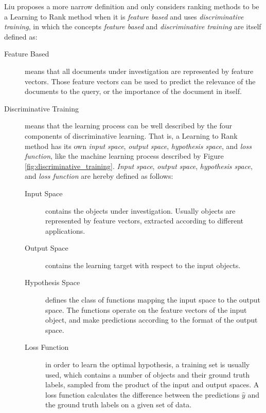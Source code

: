 Liu \cite{Liu2007} proposes a more narrow definition and only considers ranking methods to be a Learning to Rank method when it is \emph{feature based} and uses \emph{discriminative training}, in which the concepts \emph{feature based} and \emph{discriminative training} are itself defined as:
\begin{description}
\item[Feature Based]{means that all documents under investigation are represented by feature vectors. Those feature vectors can be used to predict the relevance of the documents to the query, or the importance of the document in itself.}
\item[Discriminative Training]{means that the learning process can be well described by the four components of discriminative learning. That is, a Learning to Rank method has its own \emph{input space}, \emph{output space}, \emph{hypothesis space}, and \emph{loss function}, like the machine learning process described by Figure \ref{fig:discriminative_training}. \emph{Input space}, \emph{output space}, \emph{hypothesis space}, and \emph{loss function} are hereby defined as follows:
	\begin{description}
	\item[Input Space]{contains the objects under investigation. Usually objects are represented by feature vectors, extracted according to different applications.}
	\item[Output Space]{contains the learning target with respect to the input objects.}
	\item[Hypothesis Space]{defines the class of functions mapping the input space to the output space. The functions operate on the feature vectors of the input object, and make predictions according to the format of the output space.}
	\item[Loss Function]{in order to learn the optimal hypothesis, a training set is usually used, which contains a number of objects and their ground truth labels, sampled from the product of the input and output spaces. A loss function calculates the difference between the predictions $\hat{y}$ and the ground truth labels on a given set of data.}
	\end{description}
	}
\end{description}


